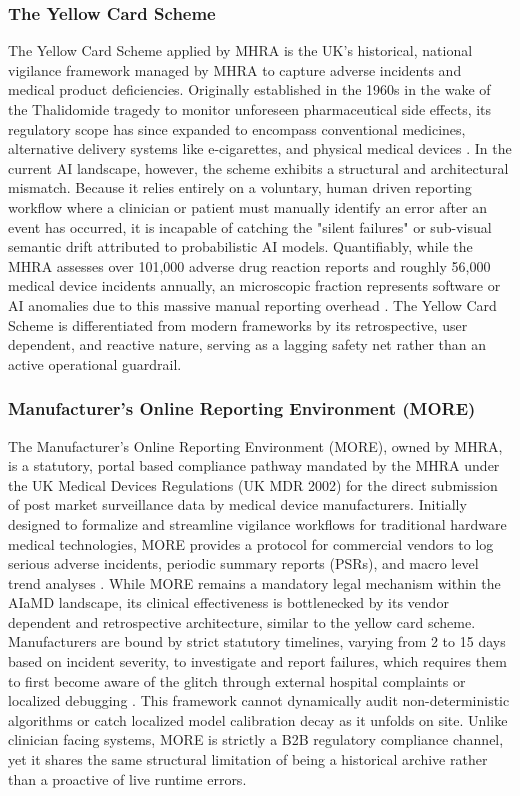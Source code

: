 \documentclass[11pt,a4paper]{article}
\begin{document}
\subsubsection{The Yellow Card Scheme}
\label{sec:The Yellow Card Scheme}
The Yellow Card Scheme applied by MHRA is the UK's historical, national vigilance framework managed by MHRA to capture adverse incidents and medical product deficiencies. Originally established in the 1960s in the wake of the Thalidomide tragedy to monitor unforeseen pharmaceutical side effects, its regulatory scope has since expanded to encompass conventional medicines, alternative delivery systems like e-cigarettes, and physical medical devices \cite{vargesson2015} \cite{greener2017} . In the current AI landscape, however, the scheme exhibits a  structural and architectural mismatch. Because it relies entirely on a voluntary, human driven reporting workflow where a clinician or patient must manually identify an error after an event has occurred, it is incapable of catching the "silent failures" or sub-visual semantic drift attributed to probabilistic AI models. Quantifiably, while the MHRA assesses over 101,000 adverse drug reaction reports and roughly 56,000 medical device incidents annually, an microscopic fraction represents software or AI anomalies due to this massive manual reporting overhead \cite{fda_gmlp_2021} . The Yellow Card Scheme is  differentiated from modern frameworks by its retrospective, user dependent, and reactive nature, serving as a lagging safety net rather than an active operational guardrail.

\subsubsection{Manufacturer's Online Reporting Environment (MORE)}
\label{sec:Manufacturer's Online Reporting Environment (MORE)}
The Manufacturer’s Online Reporting Environment (MORE), owned by MHRA, is a statutory, portal based compliance pathway mandated by the MHRA under the UK Medical Devices Regulations (UK MDR 2002) for the direct submission of post market surveillance data by medical device manufacturers. Initially designed to formalize and streamline vigilance workflows for traditional hardware medical technologies, MORE provides a  protocol for commercial vendors to log serious adverse incidents, periodic summary reports (PSRs), and macro level trend analyses \cite{mhra2021} . While MORE remains a mandatory legal mechanism within the AIaMD landscape, its clinical effectiveness is  bottlenecked by its vendor dependent and retrospective architecture, similar to the yellow card scheme. Manufacturers are bound by strict statutory timelines, varying from 2 to 15 days based on incident severity, to investigate and report failures, which requires them to first become aware of the glitch through external hospital complaints or localized debugging \cite{mhra2021} . This framework cannot dynamically audit non-deterministic algorithms or catch localized model calibration decay as it unfolds  on site. Unlike clinician facing systems, MORE is strictly a B2B regulatory compliance channel, yet it shares the same structural limitation of being a historical archive rather than a proactive of live runtime errors.
\end{document}

